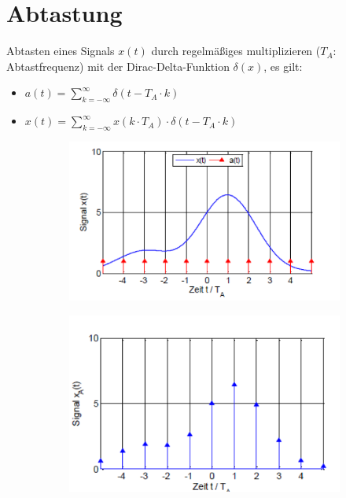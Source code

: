 \documentclass[12pt,a4paper]{article}
\begin{document}
\section{Abtastung}
Abtasten eines Signals $x(t)$ durch regelmäßiges multiplizieren ($T_A$: Abtastfrequenz) mit der Dirac-Delta-Funktion $\delta(x)$, es gilt:
\begin{itemize}
\item $\displaystyle a(t) = \sum_{k=-\infty}^\infty \delta(t-T_A\cdot k)$
\item $\displaystyle x(t) = \sum_{k=-\infty}^\infty x(k\cdot T_A)\cdot \delta(t-T_A\cdot k)$
\end{itemize}

\begin{figure}[H]
\begin{subfigure}{0.42\textwidth}
\includegraphics[width=\textwidth]{./resources/abtast_1.png}
\end{subfigure}
\begin{subfigure}{0.4\textwidth}
\includegraphics[width=\textwidth]{./resources/abtast_2.png}
\end{subfigure}
\end{figure}
\end{document}
